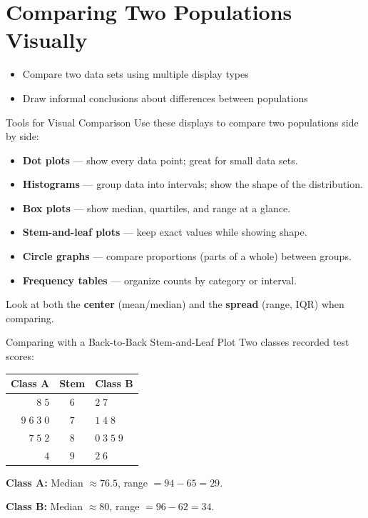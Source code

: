 \section{Comparing Two Populations Visually}

\begin{learningGoals}
\begin{itemize}
    \item Compare two data sets using multiple display types
    \item Draw informal conclusions about differences between populations
\end{itemize}
\end{learningGoals}

\begin{conceptBox}{Tools for Visual Comparison}
Use these displays to compare two populations side by side:
\begin{itemize}[leftmargin=*]
    \item \textbf{Dot plots} — show every data point; great for small data sets.
    \item \textbf{Histograms} — group data into intervals; show the shape of the distribution.
    \item \textbf{Box plots} — show median, quartiles, and range at a glance.
    \item \textbf{Stem-and-leaf plots} — keep exact values while showing shape.
    \item \textbf{Circle graphs} — compare proportions (parts of a whole) between groups.
    \item \textbf{Frequency tables} — organize counts by category or interval.
\end{itemize}
Look at both the \textbf{center} (mean/median) and the \textbf{spread} (range, IQR) when comparing.
\end{conceptBox}

\begin{workedExample}{Comparing with a Back-to-Back Stem-and-Leaf Plot}
Two classes recorded test scores:

\begin{center}
\begin{tabular}{r|c|l}
\textbf{Class A} & \textbf{Stem} & \textbf{Class B} \\
\hline
$8\;5$ & $6$ & $2\;7$ \\
$9\;6\;3\;0$ & $7$ & $1\;4\;8$ \\
$7\;5\;2$ & $8$ & $0\;3\;5\;9$ \\
$4$ & $9$ & $2\;6$
\end{tabular}
\end{center}

\textbf{Class A:} Median $\approx 76.5$, range $= 94 - 65 = 29$.

\textbf{Class B:} Median $\approx 80$, range $= 96 - 62 = 34$.

\end{workedExample}

